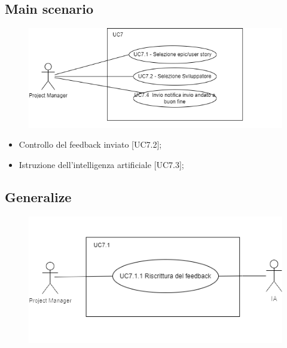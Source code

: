 \documentclass{article}
\begin{document}
    \subsection*{Main scenario}
        \begin{figure}[h]
            \centering
            \includegraphics{./imgUML/UC7-zoom.png}
            \label{fig:immagine}
        \end{figure}
        \begin{itemize}
            \item Controllo del feedback inviato [UC7.2];
            \item Istruzione dell'intelligenza artificiale [UC7.3];
        \end{itemize}
        
    \subsection*{Generalize}
      \begin{figure}[h]
            \centering
            \includegraphics{./imgUML/UC7-zoom1.png}
            \label{fig:immagine}
        \end{figure}
\end{document}
